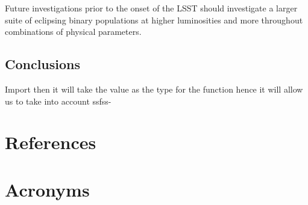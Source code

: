 \documentclass[DM,authoryear,toc]{lsstdoc}
\begin{document}
Future investigations prior to the onset of the LSST should investigate a larger suite of eclipsing binary populations at higher luminosities and more throughout  combinations of physical parameters.


\subsection{Conclusions}
Import then it will take the value as the type for the function hence it will allow us to take into account ssfss-


\appendix
\section{References} \label{sec:bib}


\section{Acronyms} \label{sec:acronyms}

\end{document}
